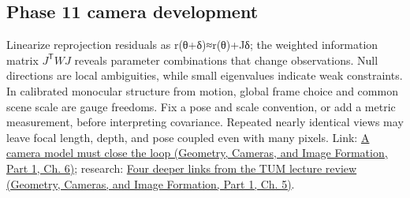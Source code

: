 \subsection{Phase 11 camera development}\label{appendix-3ee9861904d5-phase-11-camera-development}

\hypertarget{appendix-3ee9861904d5-phase-11-camera-development}{}

Linearize reprojection residuals as r(θ+δ)≈r(θ)+Jδ; the weighted information matrix \(J^{\mathsf T}WJ\) reveals parameter combinations that change observations. Null directions are local ambiguities, while small eigenvalues indicate weak constraints. In calibrated monocular structure from motion, global frame choice and common scene scale are gauge freedoms. Fix a pose and scale convention, or add a metric measurement, before interpreting covariance. Repeated nearly identical views may leave focal length, depth, and pose coupled even with many pixels. Link: \href{../03-Geometry-Cameras-and-Image-Formation-P01/main.pdf\#02-foundations-ii-ch037-a-camera-model-must-close-the-loop}{A camera model must close the loop (Geometry, Cameras, and Image Formation, Part 1, Ch. 6)}; research: \href{../03-Geometry-Cameras-and-Image-Formation-P01/main.pdf\#02-foundations-ii-ch036-four-deeper-links-from-the-tum-lecture-review}{Four deeper links from the TUM lecture review (Geometry, Cameras, and Image Formation, Part 1, Ch. 5)}.
